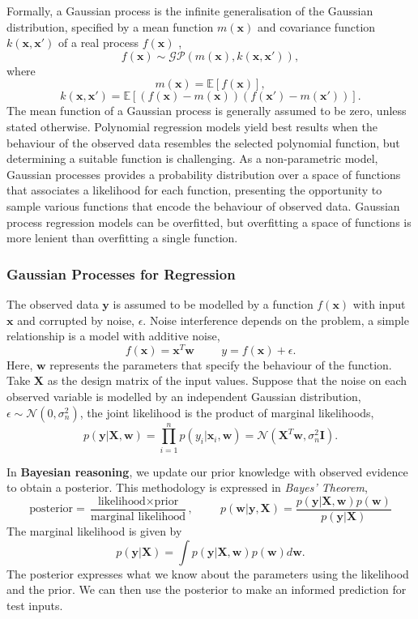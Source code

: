 \documentclass[ %
author={Dillon Keith Diep},
supervisor={Dr. Carl Henrik Ek},
degree={MEng},
title={ART-CG Hair:},
subtitle={Assisted Real-time Content Generation of Stylised Virtual Hair},
type={Research},
year={2017} ]{dissertation}
\begin{document}
Formally, a Gaussian process is the infinite generalisation of the Gaussian distribution, specified by a mean function $m(\bm{x})$ and covariance function $k(\bm{x},\bm{x'})$ of a real process $f(\bm{x})$ \cite[p.13]{gp},
$$f(\bm{x})\sim\mathcal{GP}(m(\bm{x}), k(\bm{x}, \bm{x'})),$$
where
$$m(\bm{x})=\mathbb{E}[f(\bm{x})],$$
$$k(\bm{x},\bm{x'})=\mathbb{E}[(f(\bm{x})-m(\bm{x}))(f(\bm{x'})-m(\bm{x'}))].$$
The mean function of a Gaussian process is generally assumed to be zero, unless stated otherwise.
Polynomial regression models yield best results when the behaviour of the observed data resembles the selected polynomial function, but determining a suitable function is challenging. As a non-parametric model, Gaussian processes provides a probability distribution over a space of functions that associates a likelihood for each function, presenting the opportunity to sample various functions that encode the behaviour of observed data. Gaussian process regression models can be overfitted, but overfitting a space of functions is more lenient than overfitting a single function.

\subsubsection{Gaussian Processes for Regression}
The observed data $\bm{y}$ is assumed to be modelled by a function $f(\bm{x})$ with input $\bm{x}$ and corrupted by noise, $\epsilon$. Noise interference depends on the problem, a simple relationship is a model with additive noise,
$$f(\bm{x})=\bm{x}^T\bm{w}
\hspace{1cm}
y = f(\bm{x}) + \epsilon.$$
Here, $\bm{w}$ represents the parameters that specify the behaviour of the function. Take $\bm{X}$ as the design matrix of the input values. Suppose that the noise on each observed variable is modelled by an independent Gaussian distribution, $\epsilon\sim\mathcal{N}(0, \sigma^2_n)$, the joint likelihood is the product of marginal likelihoods,
$$p(\bm{y}|\bm{X},\bm{w})=\prod^n_{i=1}p(y_i|\bm{x}_i, \bm{w})=\mathcal{N}(\bm{X}^T\bm{w}, \sigma^2_n\bm{I}).$$

In \textbf{Bayesian reasoning}, we update our prior knowledge with observed evidence to obtain a posterior. This methodology is expressed in \textit{Bayes' Theorem},
$$\text{posterior}=\frac{\text{likelihood}\times\text{prior}}{\text{marginal likelihood}}, \hspace{1cm} p(\bm{w}|\bm{y},\bm{X})=\frac{p(\bm{y}|\bm{X},\bm{w})p(\bm{w})}{p(\bm{y}|\bm{X})}$$
The marginal likelihood is given by
$$p(\bm{y}|\bm{X})=\int p(\bm{y}|\bm{X},\bm{w})p(\bm{w})d\bm{w}.$$
The posterior expresses what we know about the parameters using the likelihood and the prior. We can then use the posterior to make an informed prediction for test inputs.
\end{document}
